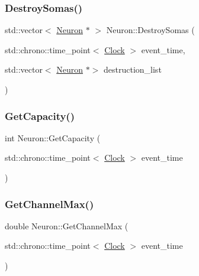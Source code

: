 \mbox{\label{classNeuron_a32b3a98eec58dc66481a2b877a7592cb}} 
\subsubsection{\texorpdfstring{Destroy\+Somas()}{DestroySomas()}}
{\footnotesize\ttfamily std\+::vector$<$ \mbox{\hyperlink{classNeuron}{Neuron}} $\ast$ $>$ Neuron\+::\+Destroy\+Somas (\begin{DoxyParamCaption}\item[{std\+::chrono\+::time\+\_\+point$<$ \mbox{\hyperlink{universe_8h_a0ef8d951d1ca5ab3cfaf7ab4c7a6fd80}{Clock}} $>$}]{event\+\_\+time,  }\item[{std\+::vector$<$ \mbox{\hyperlink{classNeuron}{Neuron}} $\ast$$>$}]{destruction\+\_\+list }\end{DoxyParamCaption})}

\mbox{\label{classNeuron_a93cce70c19c8e70accaa31908d3f29f6}} 
\subsubsection{\texorpdfstring{Get\+Capacity()}{GetCapacity()}}
{\footnotesize\ttfamily int Neuron\+::\+Get\+Capacity (\begin{DoxyParamCaption}\item[{std\+::chrono\+::time\+\_\+point$<$ \mbox{\hyperlink{universe_8h_a0ef8d951d1ca5ab3cfaf7ab4c7a6fd80}{Clock}} $>$}]{event\+\_\+time }\end{DoxyParamCaption})\hspace{0.3cm}{\ttfamily [inline]}}

\mbox{\label{classNeuron_ae8b6c47bebe302e62721dc4a6e447ca2}} 
\subsubsection{\texorpdfstring{Get\+Channel\+Max()}{GetChannelMax()}}
{\footnotesize\ttfamily double Neuron\+::\+Get\+Channel\+Max (\begin{DoxyParamCaption}\item[{std\+::chrono\+::time\+\_\+point$<$ \mbox{\hyperlink{universe_8h_a0ef8d951d1ca5ab3cfaf7ab4c7a6fd80}{Clock}} $>$}]{event\+\_\+time }\end{DoxyParamCaption})\hspace{0.3cm}{\ttfamily [inline]}}

